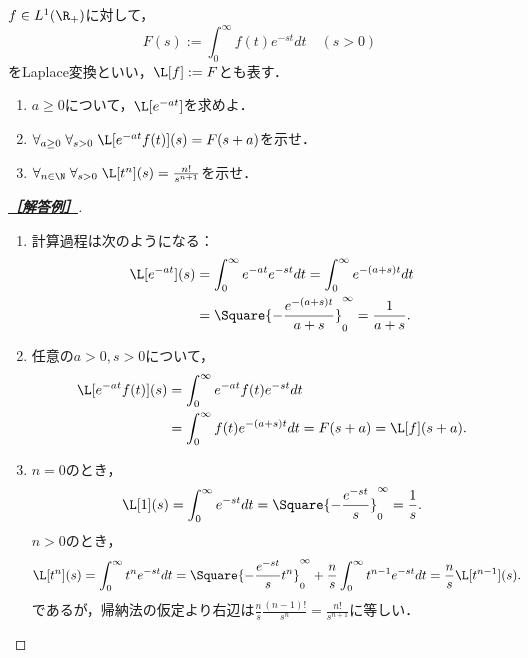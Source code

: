\documentclass[uplatex,dvipdfmx]{jsarticle}
\begin{document}
\begin{tcolorbox}[colframe=ForestGreen, colback=ForestGreen!10!white,breakable,colbacktitle=ForestGreen!40!white,coltitle=black,fonttitle=\bfseries\sffamily,
title=第２問]
    $f\in L^1(\R_+)$に対して，
    \[F(s):=\int^\infty_0f(t)e^{-st}dt\quad(s>0)\]
    をLaplace変換といい，$\L[f]:=F$とも表す．
    \begin{enumerate}
        \item $a\ge0$について，$\L[e^{-at}]$を求めよ．
        \item $\forall_{a\ge0}\;\forall_{s>0}\;\L[e^{-at}f(t)](s)=F(s+a)$を示せ．
        \item $\forall_{n\in\N}\;\forall_{s>0}\;\L[t^n](s)=\frac{n!}{s^{n+1}}$を示せ．
    \end{enumerate}
\end{tcolorbox}
\begin{proof}[\textbf{\underline{［解答例］}}]\mbox{}
    \begin{enumerate}
        \item 計算過程は次のようになる：
        \begin{align*}
            \L[e^{-at}](s)&=\int^\infty_0e^{-at}e^{-st}dt=\int^\infty_0e^{-(a+s)t}dt\\
            &=\Square{-\frac{e^{-(a+s)t}}{a+s}}^\infty_0=\frac{1}{a+s}.
        \end{align*}
        \item 任意の$a>0,s>0$について，
        \begin{align*}
            \L[e^{-at}f(t)](s)&=\int^\infty_0e^{-at}f(t)e^{-st}dt\\
            &=\int^\infty_0f(t)e^{-(a+s)t}dt=F(s+a)=\L[f](s+a).
        \end{align*}
        \item $n=0$のとき，
        \[\L[1](s)=\int^\infty_0e^{-st}dt=\Square{-\frac{e^{-st}}{s}}^\infty_0=\frac{1}{s}.\]
        $n>0$のとき，
        \begin{align*}
            \L[t^n](s)&=\int^\infty_0t^ne^{-st}dt=\Square{-\frac{e^{-st}}{s}t^n}^\infty_0+\frac{n}{s}\int^\infty_0t^{n-1}e^{-st}dt=\frac{n}{s}\L[t^{n-1}](s).
        \end{align*}
        であるが，帰納法の仮定より右辺は$\frac{n}{s}\frac{(n-1)!}{s^{n}}=\frac{n!}{s^{n+1}}$に等しい．
    \end{enumerate}
\end{proof}
\end{document}
